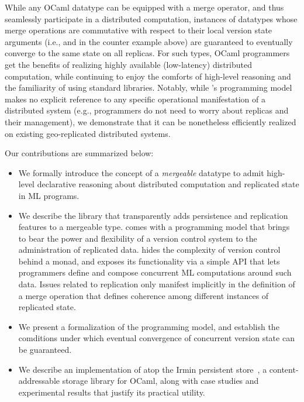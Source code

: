 While any OCaml datatype can be equipped with a merge operator, and
thus seamlessly participate in a distributed computation, instances of
datatypes whose merge operations are commutative with respect to their
local version state arguments (i.e.,  and  in the counter
example above) are guaranteed to eventually converge to the same state
on all replicas.  For such types, OCaml programmers get the benefits
of realizing highly available (low-latency) distributed computation,
while continuing to enjoy the comforts of high-level reasoning and
the familiarity of using standard libraries.  Notably, while \name's
programming model makes no explicit reference to any specific
operational manifestation of a distributed system (e.g., programmers
do not need to worry about replicas and their management), we
demonstrate that it can be nonetheless efficiently realized on
existing geo-replicated distributed systems.

Our contributions are summarized below:

\begin{itemize}
    \item We formally introduce the concept of a \emph{mergeable}
      datatype to admit high-level declarative reasoning about
      distributed computation and replicated state in ML programs.

    \item We describe the \name library that transparently adds
      persistence and replication features to a mergeable type. \name
      comes with a programming model that brings to bear the power and
      flexibility of a version control system to the administration of
      replicated data. \name hides the complexity of version control
      behind a monad, and exposes its functionality via a simple API
      that lets programmers define and compose concurrent ML
      computations around such data.  Issues related to replication
      only manifest implicitly in the definition of a merge operation
      that defines coherence among different instances of replicated
      state.

    \item We present a formalization of the \name programming model,
      and establish the comditions under which eventual convergence of
      concurrent version state can be guaranteed.

    \item We describe an implementation of \name atop the Irmin
      persistent store~\cite{irmin}, a content-addressable storage
      library for OCaml, along with case studies and experimental
      results that justify its practical utility.
\end{itemize}




